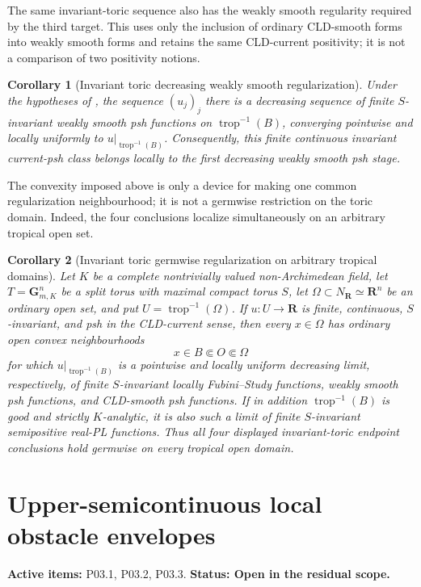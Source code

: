 \documentclass[11pt,a4paper]{article}
\newtheorem{corollary}[corollary]{Corollary}
\theoremstyle{definition}
\theoremstyle{remark}
\begin{document}
The same invariant-toric sequence also has the weakly smooth regularity
required by the third target.  This uses only the inclusion of ordinary
CLD-smooth forms into weakly smooth forms and retains the same
CLD-current positivity; it is not a comparison of two positivity notions.


\begin{corollary}[Invariant toric decreasing weakly smooth regularization]
\label{cor:p023-invariant-toric-weakly-smooth-regularization}
Under the hypotheses of
, the sequence
\((u_j)_j\) there is a decreasing sequence of finite \(S\)-invariant weakly
smooth psh functions on \(\operatorname{trop}^{-1}(B)\), converging pointwise
and locally uniformly to \(u|_{\operatorname{trop}^{-1}(B)}\).
Consequently, this finite continuous invariant current-psh class belongs
locally to the first decreasing weakly smooth psh stage.
\end{corollary}




The convexity imposed above is only a device for making one common
regularization neighbourhood; it is not a germwise restriction on the
toric domain.  Indeed, the four conclusions localize simultaneously on an
arbitrary tropical open set.
\begin{corollary}[Invariant toric germwise regularization on arbitrary tropical domains]
\label{cor:p02-invariant-toric-germwise-regularization}
Let \(K\) be a complete nontrivially valued non-Archimedean field, let
\(T=\mathbf G_{m,K}^n\) be a split torus with maximal compact torus \(S\),
let \(\Omega\subset N_{\mathbf R}\simeq\mathbf R^n\) be an ordinary open
set, and put \(U=\operatorname{trop}^{-1}(\Omega)\).  If
\(u:U\to\mathbf R\) is finite, continuous, \(S\)-invariant, and psh in the
CLD-current sense, then every \(x\in\Omega\) has ordinary open convex
neighbourhoods
\[
                  x\in B\Subset O\Subset\Omega
\]
for which \(u|_{\operatorname{trop}^{-1}(B)}\) is a pointwise and locally
uniform decreasing limit, respectively, of finite \(S\)-invariant locally
Fubini--Study functions, weakly smooth psh functions, and CLD-smooth psh
functions.  If in addition \(\operatorname{trop}^{-1}(B)\) is good and
strictly \(K\)-analytic, it is also such a limit of finite \(S\)-invariant
semipositive real-PL functions.
Thus all four displayed invariant-toric endpoint conclusions hold germwise
on every tropical open domain.
\end{corollary}

\clearpage\section{Upper-semicontinuous local obstacle envelopes}
\label{family:2}
\noindent\textbf{Active items:} P03.1, P03.2, P03.3. \textbf{Status: Open in the residual scope.}
\end{document}

